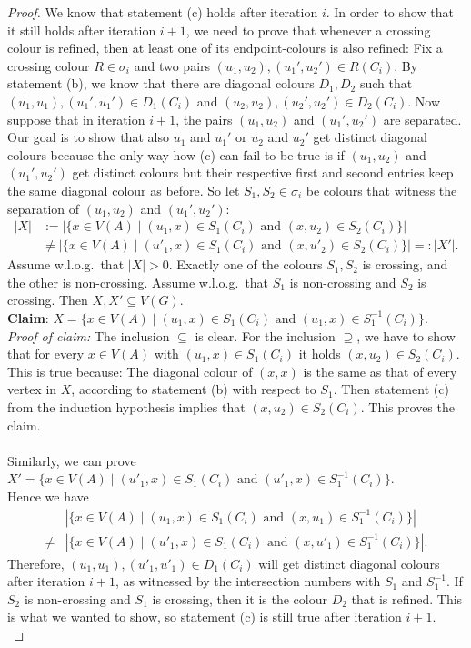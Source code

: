\documentclass[10pt,a4paper]{article}
\begin{document}
\begin{proof}
			We know that statement (c) holds after iteration $i$. In order to show that it still holds after iteration $i+1$, we need to prove that whenever a crossing colour is refined, then at least one of its endpoint-colours is also refined: Fix a crossing colour $R \in \sigma_i$ and two pairs $(u_1,u_2), (u_1',u_2') \in R(C_i)$. By statement (b), we know that there are diagonal colours $D_1, D_2$ such that $(u_1,u_1), (u_1',u_1') \in D_1(C_i)$ and $(u_2,u_2), (u_2',u_2') \in D_2(C_i)$. Now suppose that in iteration $i+1$, the pairs $(u_1,u_2)$ and $(u_1',u_2')$ are separated. Our goal is to show that also $u_1$ and $u_1'$ or $u_2$ and $u_2'$ get distinct diagonal colours because the only way how (c) can fail to be true is if $(u_1,u_2)$ and $(u_1',u_2')$ get distinct colours but their respective first and second entries keep the same diagonal colour as before. 
			So let $S_1, S_2 \in \sigma_i$ be colours that witness the separation of $(u_1,u_2)$ and $(u_1',u_2')$:  	
			\begin{align*}
				|X | &:= |\{ x \in V(A) \mid (u_1,x) \in S_1(C_i) \text{ and } (x,u_2) \in S_2(C_i)  \}|\\
				& \neq |\{ x \in V(A) \mid (u'_1,x) \in S_1(C_i) \text{ and } (x,u'_2) \in S_2(C_i) \}| =: | X' | .
			\end{align*}
			Assume w.l.o.g.\ that $|X| > 0$. Exactly one of the colours $S_1, S_2$ is crossing, and the other is non-crossing. Assume w.l.o.g.\ that $S_1$ is non-crossing and $S_2$ is crossing. Then $X,X' \subseteq V(G).$\\
			\textbf{Claim}: $X = \{ x \in V(A) \mid (u_1,x) \in S_1(C_i) \text{ and } (u_1,x) \in S_1^{-1}(C_i)  \}$.\\
			\textit{Proof of claim:} The inclusion $\subseteq$ is clear. For the inclusion $\supseteq$, we have to show that for every $x \in V(A)$ with $(u_1,x) \in S_1(C_i)$ it holds $(x,u_2) \in S_2(C_i)$. This is true because: The diagonal colour of $(x,x)$ is the same as that of every vertex in $X$, according to statement (b) with respect to $S_1$. Then statement (c) from the induction hypothesis implies that $(x,u_2) \in S_2(C_i)$. This proves the claim.\\
			\\
			Similarly, we can prove $X' = \{ x \in V(A) \mid (u'_1,x) \in S_1(C_i) \text{ and } (u'_1,x) \in S_1^{-1}(C_i)  \}$.\\
			Hence we have
			\begin{align*}
				& |\{ x \in V(A) \mid (u_1,x) \in S_1(C_i) \text{ and } (x,u_1) \in S_1^{-1}(C_i)  \}|\\
				\neq &|\{ x \in V(A) \mid (u'_1,x) \in S_1(C_i) \text{ and } (x,u'_1) \in S_1^{-1}(C_i) \}|.
			\end{align*}
			Therefore, $(u_1,u_1), (u'_1,u'_1) \in D_1(C_i)$ will get distinct diagonal colours after iteration $i+1$, as witnessed by the intersection numbers with $S_1$ and $S_1^{-1}$. If $S_2$ is non-crossing and $S_1$ is crossing, then it is the colour $D_2$ that is refined. This is what we wanted to show, so statement (c) is still true after iteration $i+1$.\\
			

\end{proof}
\end{document}
